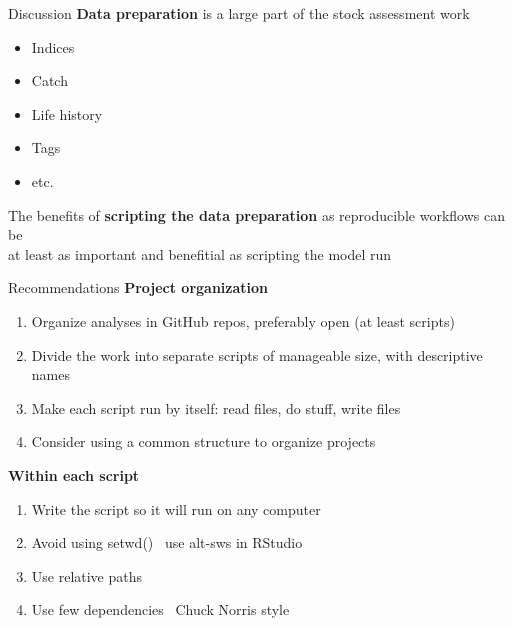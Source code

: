 \documentclass[aspectratio=169]{beamer}
\begin{document}

\begin{frame}{Discussion}
  \textbf{\green Data preparation} is a large part of the stock assessment
  work\\[2ex]
  \begin{itemize}
    \item[] Indices 
    \item[] Catch 
    \item[] Life history 
    \item[] Tags 
    \item[] etc.\\[3ex]
  \end{itemize}
  The benefits of {\bf scripting the data preparation} as reproducible workflows
  can be\\[0.2ex]
  at least as important and benefitial as scripting the model run\\[2ex]
\end{frame}


\begin{frame}{Recommendations}
  \textbf{\green Project organization}
  \begin{enumerate}
    \item Organize analyses in GitHub repos, preferably open (at least scripts)
    \item Divide the work into separate scripts of manageable size, with
    descriptive names
    \item Make each script run by itself: read files, do stuff, write files
    \item Consider using a common structure to organize projects\\[3ex]
  \end{enumerate}
  \textbf{\green Within each script}
  \begin{enumerate}
    \item Write the script so it will run on any computer
    \item Avoid using setwd() {~\quad\small\gray use alt-sws in RStudio}
    \item Use relative paths
    \item Use few dependencies {~\quad\small\gray Chuck Norris style}
  \end{enumerate}
\end{frame}
\end{document}
